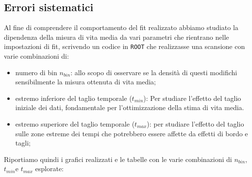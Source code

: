 \documentclass[10pt,a4paper]{article}
\begin{document}
\subsection{Errori sistematici}\label{subsec:sys_err}
\begin{flushleft}


Al fine di comprendere il comportamento del fit realizzato abbiamo studiato la dipendenza della misura di vita media da vari parametri che rientrano nelle impostazioni di fit, scrivendo un codice in \texttt{ROOT} che realizzasse una scansione con varie combinazioni di:
\begin{itemize}
\item numero di bin $n_{bin}$: allo scopo di osservare se la densità di questi modifichi sensibilmente la misura ottenuta di vita media;
\item estremo inferiore del taglio temporale ($t_{min}$): Per studiare l'effetto del taglio iniziale dei dati, fondamentale per l'ottimizzazione della stima di vita media.
\item estremo superiore del taglio temporale ($t_{max}$): per studiare l'effetto del taglio sulle zone estreme dei tempi che potrebbero essere affette da effetti di bordo e tagli; 
\end{itemize}
Riportiamo quindi i grafici realizzati e le tabelle con le varie combinazioni di $n_{bin}$, $t_{min}$e $t_{max}$ esplorate:

\begin{table}[h]
\centering
\label{tab:combination}
\resizebox{0.25\linewidth}{!}{}
\caption{Tabella dei valori dei parametri utilizzati per i test effettuati}
\end{table}


\end{flushleft}
\end{document}
